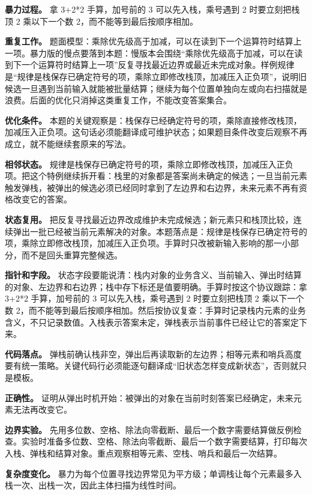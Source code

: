 \textbf{暴力过程。} 拿 3+2*2 手算，加号前的 3 可以先入栈，乘号遇到 2 时要立刻把栈顶 2 乘以下一个数 2，而不能等到最后按顺序相加。

\textbf{重复工作。} 题面模型：乘除优先级高于加减，可以在读到下一个运算符时结算上一项。暴力版的慢点要落到本题：慢版本会围绕“乘除优先级高于加减，可以在读到下一个运算符时结算上一项”反复寻找最近边界或最近未完成对象。样例规律是“规律是栈保存已确定符号的项，乘除立即修改栈顶，加减压入正负项”，说明旧候选一旦遇到当前输入就能被批量结算；继续为每个位置单独向左或向右扫描就是浪费。后面的优化只消掉这类重复工作，不能改变答案集合。

\textbf{优化条件。} 本题的关键观察是：栈保存已经确定符号的项，乘除直接修改栈顶，加减压入正负项。这句话必须能翻译成可维护状态；如果题目条件改变后观察不再成立，就不能继续套原来的写法。

\textbf{相邻状态。} 规律是栈保存已确定符号的项，乘除立即修改栈顶，加减压入正负项。把这个特例继续拆开看：栈里的对象都是答案尚未确定的候选；一旦当前元素触发弹栈，被弹出的候选必须已经同时拿到了左边界和右边界，未来元素不再有资格改变它的答案。

\textbf{状态复用。} 把反复寻找最近边界改成维护未完成候选；新元素只和栈顶比较，连续弹出一批已经被当前元素解决的对象。本题落点是：规律是栈保存已确定符号的项，乘除立即修改栈顶，加减压入正负项。手算时只改被新输入影响的那一小部分，而不是回头重算完整候选。

\textbf{指针和字段。} 状态字段要能说清：栈内对象的业务含义、当前输入、弹出时结算的对象、左边界和右边界；栈中存下标还是值要明确。手算时按这个协议跟踪：拿 3+2*2 手算，加号前的 3 可以先入栈，乘号遇到 2 时要立刻把栈顶 2 乘以下一个数 2，而不能等到最后按顺序相加。然后按协议复查：手算时记录栈内元素的业务含义，不只记录数值。入栈表示答案未定，弹栈表示当前事件已经让它的答案定下来。

\textbf{代码落点。} 弹栈前确认栈非空，弹出后再读取新的左边界；相等元素和哨兵高度要有统一策略。关键代码行必须能逐句翻译成“旧状态怎样变成新状态”，否则就只是模板。

\textbf{正确性。} 证明从弹出时机开始：被弹出的对象在当前时刻答案已经确定，未来元素无法再改变它。

\textbf{边界实验。} 先用多位数、空格、除法向零截断、最后一个数字需要结算做反例检查。实验时准备多位数、空格、除法向零截断、最后一个数字需要结算，打印每次入栈、弹栈和结算对象。重点观察相等元素、空栈、哨兵和最后一次结算。

\textbf{复杂度变化。} 暴力为每个位置寻找边界常见为平方级；单调栈让每个元素最多入栈一次、出栈一次，因此主体扫描为线性时间。

